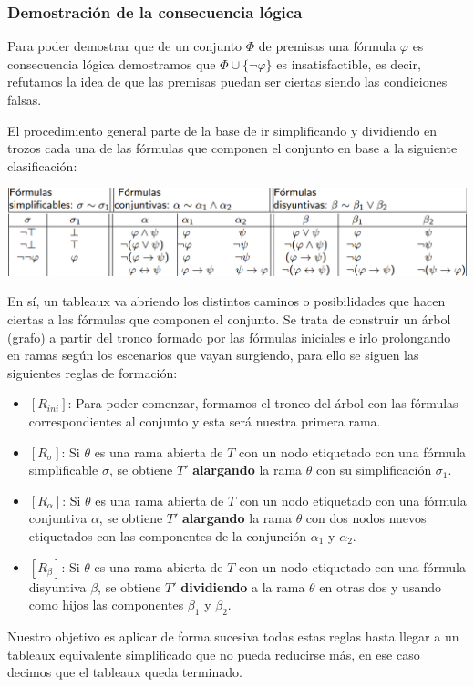 \documentclass[10pt,a4paper,openright]{book}
\begin{document}
\subsubsection*{Demostración de la consecuencia lógica}
Para poder demostrar que de un conjunto $\Phi$ de premisas una fórmula $\varphi$ es consecuencia lógica demostramos que $\Phi\cup\{\neg \varphi\}$ es insatisfactible, es decir, refutamos la idea de que las premisas puedan ser ciertas siendo las condiciones falsas.

El procedimiento general parte de la base de ir simplificando y dividiendo en trozos cada una de las fórmulas que componen el conjunto en base a la siguiente clasificación:
\begin{center}
\includegraphics[scale=0.6]{formulas tableaux}
\end{center}

En sí, un tableaux va abriendo los distintos caminos o posibilidades que hacen ciertas a las fórmulas que componen el conjunto. Se trata de construir un árbol (grafo) a partir del tronco formado por las fórmulas iniciales e irlo prolongando en ramas según los escenarios que vayan surgiendo, para ello se siguen las siguientes reglas de formación:
\begin{itemize}
\item $[R_{ini}]$: Para poder comenzar, formamos el tronco del árbol con las fórmulas correspondientes al conjunto y esta será nuestra primera rama.

\item $[R_\sigma]$: Si $\theta$ es una rama abierta de $T$ con un nodo etiquetado con una fórmula simplificable $\sigma$, se obtiene $T'$ \textbf{alargando} la rama $\theta$ con su simplificación $\sigma_1$.

\item $[R_\alpha]$: Si $\theta$  es una rama abierta de $T$ con un nodo etiquetado con una fórmula conjuntiva $\alpha$, se obtiene $T'$ \textbf{alargando} la rama $\theta$ con dos nodos nuevos etiquetados con las componentes de la conjunción $\alpha_1$ y $\alpha_2$.

\item $[R_\beta]$: Si $\theta$ es una rama abierta de $T$ con un nodo etiquetado con una fórmula disyuntiva $\beta$, se obtiene $T'$ \textbf{dividiendo} a la rama $\theta$ en otras dos y usando como hijos las componentes $\beta_1$ y $\beta_2$.
\end{itemize}
Nuestro objetivo es aplicar de forma sucesiva todas estas reglas hasta llegar a un tableaux equivalente simplificado que no pueda reducirse más, en ese caso decimos que el tableaux queda terminado. 
\end{document}
